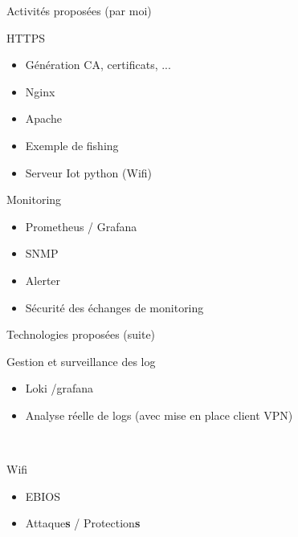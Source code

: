 \documentclass[12pt, handout]{beamer}
\begin{document}
\begin{frame}{Activités proposées (par moi)}

\begin{block}{HTTPS}
\begin{itemize}
\item Génération CA, certificats, ...
\item Nginx
\item Apache
\item Exemple de fishing
\item Serveur Iot python (Wifi)
\end{itemize}
\end{block}


\begin{block}{Monitoring}
\begin{itemize}
\item Prometheus / Grafana
\item SNMP
\item Alerter 
\item Sécurité des échanges de monitoring
\end{itemize}
\end{block}
\end{frame}

\begin{frame}{Technologies proposées (suite)}

\begin{block}{Gestion et surveillance des log}
\begin{itemize}
\item Loki /grafana
\item Analyse réelle de logs (avec mise en place client VPN)
\end{itemize}
\end{block}
\

\begin{block}{Wifi}
\begin{itemize}
\item EBIOS
\item Attaque\textbf{s} / Protection\textbf{s}
\end{itemize}
\end{block}
\end{frame}
\end{document}
